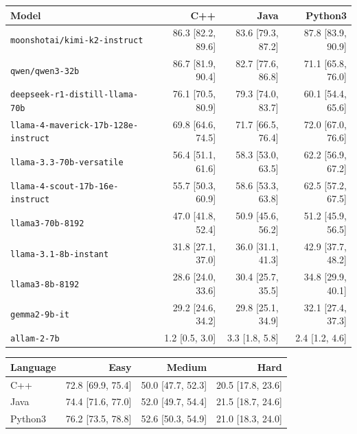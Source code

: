 \begin{tabular}{lrrr}
\hline\hline
\textbf{Model} & \textbf{C++} & \textbf{Java} & \textbf{Python3} \\
\hline
\texttt{moonshotai/kimi-k2-instruct} & 86.3 {\scriptsize[82.2, 89.6]} & 83.6 {\scriptsize[79.3, 87.2]} & 87.8 {\scriptsize[83.9, 90.9]} \\
\texttt{qwen/qwen3-32b} & 86.7 {\scriptsize[81.9, 90.4]} & 82.7 {\scriptsize[77.6, 86.8]} & 71.1 {\scriptsize[65.8, 76.0]} \\
\texttt{deepseek-r1-distill-llama-70b} & 76.1 {\scriptsize[70.5, 80.9]} & 79.3 {\scriptsize[74.0, 83.7]} & 60.1 {\scriptsize[54.4, 65.6]} \\
\texttt{llama-4-maverick-17b-128e-instruct} & 69.8 {\scriptsize[64.6, 74.5]} & 71.7 {\scriptsize[66.5, 76.4]} & 72.0 {\scriptsize[67.0, 76.6]} \\
\texttt{llama-3.3-70b-versatile} & 56.4 {\scriptsize[51.1, 61.6]} & 58.3 {\scriptsize[53.0, 63.5]} & 62.2 {\scriptsize[56.9, 67.2]} \\
\texttt{llama-4-scout-17b-16e-instruct} & 55.7 {\scriptsize[50.3, 60.9]} & 58.6 {\scriptsize[53.3, 63.8]} & 62.5 {\scriptsize[57.2, 67.5]} \\
\texttt{llama3-70b-8192} & 47.0 {\scriptsize[41.8, 52.4]} & 50.9 {\scriptsize[45.6, 56.2]} & 51.2 {\scriptsize[45.9, 56.5]} \\
\texttt{llama-3.1-8b-instant} & 31.8 {\scriptsize[27.1, 37.0]} & 36.0 {\scriptsize[31.1, 41.3]} & 42.9 {\scriptsize[37.7, 48.2]} \\
\texttt{llama3-8b-8192} & 28.6 {\scriptsize[24.0, 33.6]} & 30.4 {\scriptsize[25.7, 35.5]} & 34.8 {\scriptsize[29.9, 40.1]} \\
\texttt{gemma2-9b-it} & 29.2 {\scriptsize[24.6, 34.2]} & 29.8 {\scriptsize[25.1, 34.9]} & 32.1 {\scriptsize[27.4, 37.3]} \\
\texttt{allam-2-7b} & 1.2 {\scriptsize[0.5, 3.0]} & 3.3 {\scriptsize[1.8, 5.8]} & 2.4 {\scriptsize[1.2, 4.6]} \\
\hline\hline
\end{tabular}

\begin{tabular}{lrrr}
\hline\hline
\textbf{Language} & \textbf{Easy} & \textbf{Medium} & \textbf{Hard} \\
\hline
C++ & 72.8 {\scriptsize[69.9, 75.4]} & 50.0 {\scriptsize[47.7, 52.3]} & 20.5 {\scriptsize[17.8, 23.6]} \\
Java & 74.4 {\scriptsize[71.6, 77.0]} & 52.0 {\scriptsize[49.7, 54.4]} & 21.5 {\scriptsize[18.7, 24.6]} \\
Python3 & 76.2 {\scriptsize[73.5, 78.8]} & 52.6 {\scriptsize[50.3, 54.9]} & 21.0 {\scriptsize[18.3, 24.0]} \\
\hline\hline
\end{tabular}

